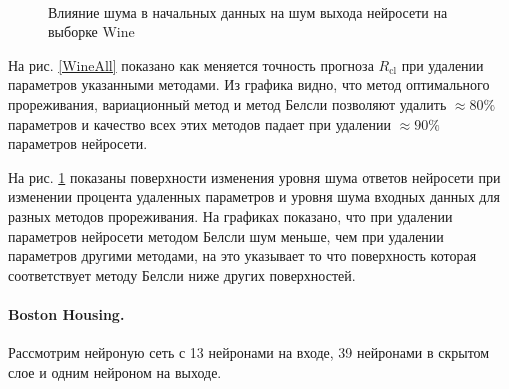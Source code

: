 \begin{figure}[h!t]\center
{}
\\
\caption{Влияние шума в начальных данных на шум выхода нейросети на выборке Wine}
\label{WineNoise}
\end{figure}

На рис. \ref{WineAll} показано как меняется точность прогноза $R_{\text{cl}}$ при удалении параметров указанными методами. Из графика видно, что метод оптимального прореживания, вариационный метод и метод Белсли позволяют удалить $\approx80\%$ параметров и качество всех этих методов падает при удалении $\approx90\%$ параметров нейросети. 

На рис. \ref{WineNoise} показаны поверхности изменения уровня шума ответов нейросети при изменении процента удаленных параметров и уровня шума входных данных для разных методов прореживания. На графиках показано, что при удалении параметров нейросети методом Белсли шум меньше, чем при удалении параметров другими методами, на это указывает то что поверхность которая соответствует методу Белсли ниже других поверхностей.

\paragraph{Boston Housing.} Рассмотрим нейроную сеть с 13 нейронами на входе, 39 нейронами в скрытом слое и одним нейроном на выходе.

